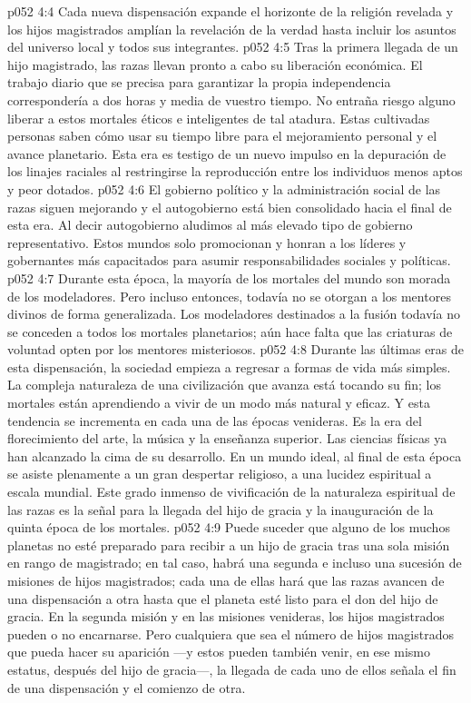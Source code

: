 \vs p052 4:4 Cada nueva dispensación expande el horizonte de la religión revelada y los hijos magistrados amplían la revelación de la verdad hasta incluir los asuntos del universo local y todos sus integrantes.
\vs p052 4:5 \pc Tras la primera llegada de un hijo magistrado, las razas llevan pronto a cabo su liberación económica. El trabajo diario que se precisa para garantizar la propia independencia correspondería a dos horas y media de vuestro tiempo. No entraña riesgo alguno liberar a estos mortales éticos e inteligentes de tal atadura. Estas cultivadas personas saben cómo usar su tiempo libre para el mejoramiento personal y el avance planetario. Esta era es testigo de un nuevo impulso en la depuración de los linajes raciales al restringirse la reproducción entre los individuos menos aptos y peor dotados.
\vs p052 4:6 El gobierno político y la administración social de las razas siguen mejorando y el autogobierno está bien consolidado hacia el final de esta era. Al decir autogobierno aludimos al más elevado tipo de gobierno representativo. Estos mundos solo promocionan y honran a los líderes y gobernantes más capacitados para asumir responsabilidades sociales y políticas.
\vs p052 4:7 Durante esta época, la mayoría de los mortales del mundo son morada de los modeladores. Pero incluso entonces, todavía no se otorgan a los mentores divinos de forma generalizada. Los modeladores destinados a la fusión todavía no se conceden a todos los mortales planetarios; aún hace falta que las criaturas de voluntad opten por los mentores misteriosos.
\vs p052 4:8 Durante las últimas eras de esta dispensación, la sociedad empieza a regresar a formas de vida más simples. La compleja naturaleza de una civilización que avanza está tocando su fin; los mortales están aprendiendo a vivir de un modo más natural y eficaz. Y esta tendencia se incrementa en cada una de las épocas venideras. Es la era del florecimiento del arte, la música y la enseñanza superior. Las ciencias físicas ya han alcanzado la cima de su desarrollo. En un mundo ideal, al final de esta época se asiste plenamente a un gran despertar religioso, a una lucidez espiritual a escala mundial. Este grado inmenso de vivificación de la naturaleza espiritual de las razas es la señal para la llegada del hijo de gracia y la inauguración de la quinta época de los mortales.
\vs p052 4:9 \pc Puede suceder que alguno de los muchos planetas no esté preparado para recibir a un hijo de gracia tras una sola misión en rango de magistrado; en tal caso, habrá una segunda e incluso una sucesión de misiones de hijos magistrados; cada una de ellas hará que las razas avancen de una dispensación a otra hasta que el planeta esté listo para el don del hijo de gracia. En la segunda misión y en las misiones venideras, los hijos magistrados pueden o no encarnarse. Pero cualquiera que sea el número de hijos magistrados que pueda hacer su aparición ---y estos pueden también venir, en ese mismo estatus, después del hijo de gracia---, la llegada de cada uno de ellos señala el fin de una dispensación y el comienzo de otra.
